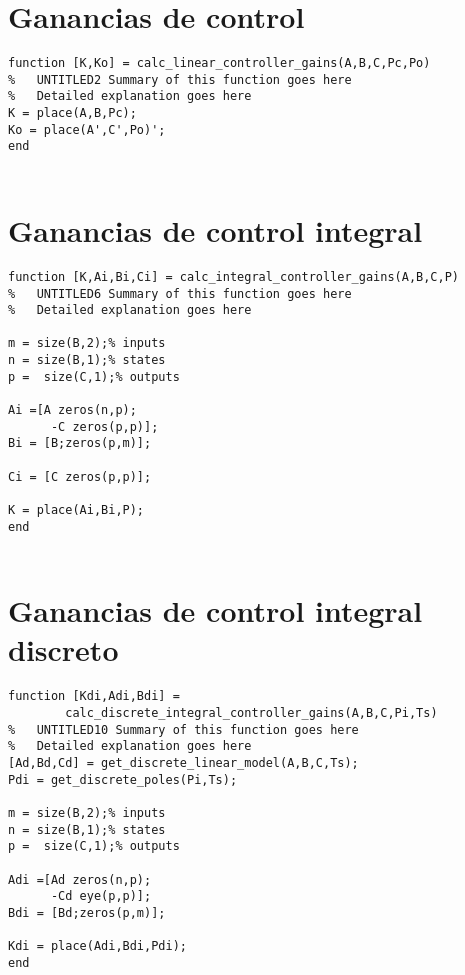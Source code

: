 \section{Ganancias de control}

\begin{lstlisting}[frame=single]
function [K,Ko] = calc_linear_controller_gains(A,B,C,Pc,Po)
%	UNTITLED2 Summary of this function goes here
%   Detailed explanation goes here
K = place(A,B,Pc);
Ko = place(A',C',Po)';
end


\end{lstlisting}

\section{Ganancias de control integral}

\begin{lstlisting}[frame=single]
function [K,Ai,Bi,Ci] = calc_integral_controller_gains(A,B,C,P)
%	UNTITLED6 Summary of this function goes here
%   Detailed explanation goes here

m = size(B,2);% inputs
n = size(B,1);% states
p =  size(C,1);% outputs

Ai =[A zeros(n,p);
      -C zeros(p,p)];
Bi = [B;zeros(p,m)];

Ci = [C zeros(p,p)];

K = place(Ai,Bi,P);
end


\end{lstlisting}

\section{Ganancias de control integral discreto}

\begin{lstlisting}[frame=single]
function [Kdi,Adi,Bdi] = 
		calc_discrete_integral_controller_gains(A,B,C,Pi,Ts)
%	UNTITLED10 Summary of this function goes here
%   Detailed explanation goes here
[Ad,Bd,Cd] = get_discrete_linear_model(A,B,C,Ts);
Pdi = get_discrete_poles(Pi,Ts);

m = size(B,2);% inputs
n = size(B,1);% states
p =  size(C,1);% outputs

Adi =[Ad zeros(n,p);
      -Cd eye(p,p)];
Bdi = [Bd;zeros(p,m)];

Kdi = place(Adi,Bdi,Pdi);
end

\end{lstlisting}


